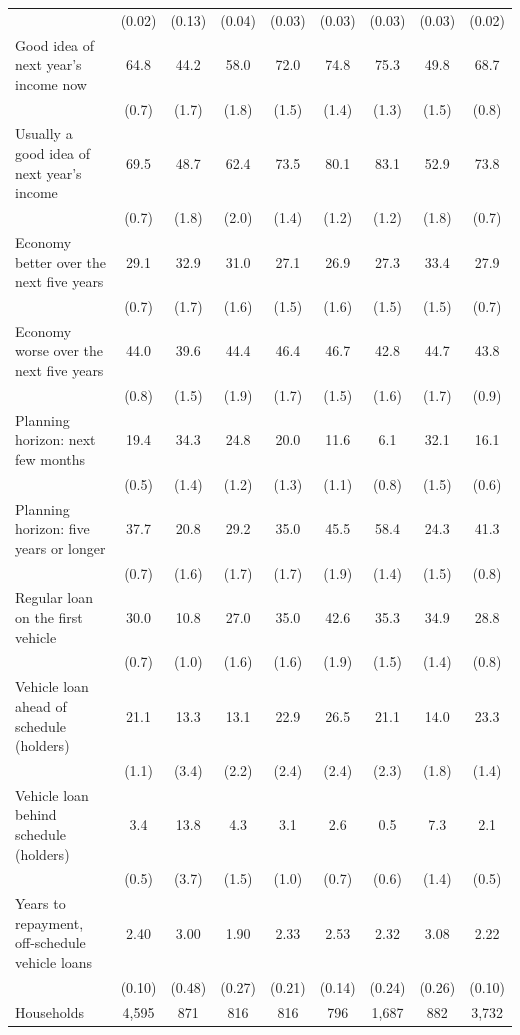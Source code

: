 \begin{tabular}{lcccccccc}
 & (0.02) & (0.13) & (0.04) & (0.03) & (0.03) & (0.03) & (0.03) & (0.02) \\
Good idea of next year's income now & 64.8 & 44.2 & 58.0 & 72.0 & 74.8 & 75.3 & 49.8 & 68.7 \\
 & (0.7) & (1.7) & (1.8) & (1.5) & (1.4) & (1.3) & (1.5) & (0.8) \\
Usually a good idea of next year's income & 69.5 & 48.7 & 62.4 & 73.5 & 80.1 & 83.1 & 52.9 & 73.8 \\
 & (0.7) & (1.8) & (2.0) & (1.4) & (1.2) & (1.2) & (1.8) & (0.7) \\
Economy better over the next five years & 29.1 & 32.9 & 31.0 & 27.1 & 26.9 & 27.3 & 33.4 & 27.9 \\
 & (0.7) & (1.7) & (1.6) & (1.5) & (1.6) & (1.5) & (1.5) & (0.7) \\
Economy worse over the next five years & 44.0 & 39.6 & 44.4 & 46.4 & 46.7 & 42.8 & 44.7 & 43.8 \\
 & (0.8) & (1.5) & (1.9) & (1.7) & (1.5) & (1.6) & (1.7) & (0.9) \\
Planning horizon: next few months & 19.4 & 34.3 & 24.8 & 20.0 & 11.6 & 6.1 & 32.1 & 16.1 \\
 & (0.5) & (1.4) & (1.2) & (1.3) & (1.1) & (0.8) & (1.5) & (0.6) \\
Planning horizon: five years or longer & 37.7 & 20.8 & 29.2 & 35.0 & 45.5 & 58.4 & 24.3 & 41.3 \\
 & (0.7) & (1.6) & (1.7) & (1.7) & (1.9) & (1.4) & (1.5) & (0.8) \\
Regular loan on the first vehicle & 30.0 & 10.8 & 27.0 & 35.0 & 42.6 & 35.3 & 34.9 & 28.8 \\
 & (0.7) & (1.0) & (1.6) & (1.6) & (1.9) & (1.5) & (1.4) & (0.8) \\
Vehicle loan ahead of schedule (holders) & 21.1 & 13.3 & 13.1 & 22.9 & 26.5 & 21.1 & 14.0 & 23.3 \\
 & (1.1) & (3.4) & (2.2) & (2.4) & (2.4) & (2.3) & (1.8) & (1.4) \\
Vehicle loan behind schedule (holders) & 3.4 & 13.8 & 4.3 & 3.1 & 2.6 & 0.5 & 7.3 & 2.1 \\
 & (0.5) & (3.7) & (1.5) & (1.0) & (0.7) & (0.6) & (1.4) & (0.5) \\
Years to repayment, off-schedule vehicle loans & 2.40 & 3.00 & 1.90 & 2.33 & 2.53 & 2.32 & 3.08 & 2.22 \\
 & (0.10) & (0.48) & (0.27) & (0.21) & (0.14) & (0.24) & (0.26) & (0.10) \\
\midrule
Households & 4,595 & 871 & 816 & 816 & 796 & 1,687 & 882 & 3,732 \\
\bottomrule
\end{tabular}
